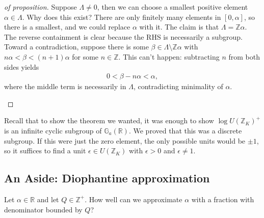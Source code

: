 \begin{proof}[of proposition]

Suppose \(\Lambda \neq 0\), then we can choose a smallest positive
element \(\alpha\in \Lambda\). Why does this exist? There are only
finitely many elements in \([0, \alpha]\), so there is a smallest, and
we could replace \(\alpha\) with it. The claim is that
\(\Lambda = {\mathbb{Z}}\alpha\). The reverse containment is clear
because the RHS is necessarily a subgroup. Toward a contradiction,
suppose there is some \(\beta\in \Lambda\setminus{\mathbb{Z}}\alpha\)
with \(n \alpha < \beta < (n+1) \alpha\) for some \(n\in {\mathbb{Z}}\).
This can't happen: subtracting \(n\) from both sides yields
\begin{align*}
0 < \beta - n \alpha < \alpha
,\end{align*}
where the middle term is necessarily in \(\Lambda\), contradicting
minimality of \(\alpha\).

\begin{figure}
\centering
{}
\end{figure}

\end{proof}

\begin{remark}

Recall that to show the theorem we wanted, it was enough to show
\(\log U({\mathbb{Z}}_K)^+\) is an infinite cyclic subgroup of
\({\mathbb{G}}_a({\mathbb{R}})\). We proved that this was a discrete
subgroup. If this were just the zero element, the only possible units
would be \(\pm 1\), so it suffices to find a unit
\(\epsilon \in U({\mathbb{Z}}_K)\) with \(\epsilon>0\) and
\(\epsilon\neq 1\).

\end{remark}

\hypertarget{an-aside-diophantine-approximation}{%
\subsection{An Aside: Diophantine
approximation}\label{an-aside-diophantine-approximation}}

\begin{remark}

Let \(\alpha\in {\mathbb{R}}\) and let \(Q \in {\mathbb{Z}}^+\). How
well can we approximate \(\alpha\) with a fraction with denominator
bounded by \(Q\)?

\end{remark}

